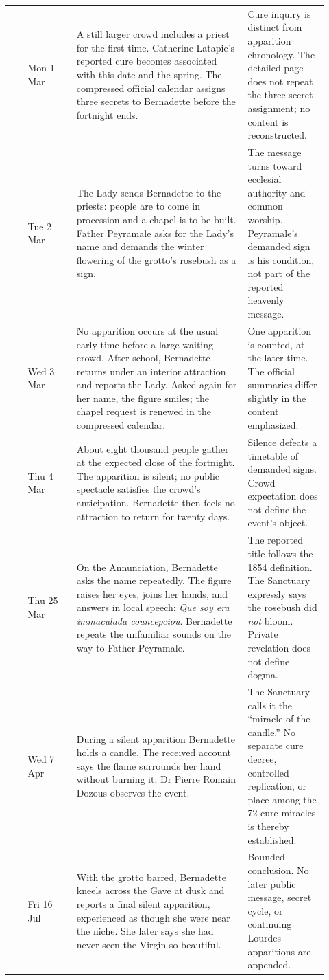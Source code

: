 \begin{longtable}{>{\bfseries\raggedright\arraybackslash}p{0.055\linewidth}>{\raggedright\arraybackslash}p{0.14\linewidth}>{\raggedright\arraybackslash}p{0.49\linewidth}>{\raggedright\arraybackslash}p{0.23\linewidth}}
12 & Mon 1 Mar & A still larger crowd includes a priest for the first time. Catherine Latapie's reported cure becomes associated with this date and the spring. The compressed official calendar assigns three secrets to Bernadette before the fortnight ends. & Cure inquiry is distinct from apparition chronology. The detailed page does not repeat the three-secret assignment; no content is reconstructed.\\
13 & Tue 2 Mar & The Lady sends Bernadette to the priests: people are to come in procession and a chapel is to be built. Father Peyramale asks for the Lady's name and demands the winter flowering of the grotto's rosebush as a sign. & The message turns toward ecclesial authority and common worship. Peyramale's demanded sign is his condition, not part of the reported heavenly message.\\
14 & Wed 3 Mar & No apparition occurs at the usual early time before a large waiting crowd. After school, Bernadette returns under an interior attraction and reports the Lady. Asked again for her name, the figure smiles; the chapel request is renewed in the compressed calendar. & One apparition is counted, at the later time. The official summaries differ slightly in the content emphasized.\\
15 & Thu 4 Mar & About eight thousand people gather at the expected close of the fortnight. The apparition is silent; no public spectacle satisfies the crowd's anticipation. Bernadette then feels no attraction to return for twenty days. & Silence defeats a timetable of demanded signs. Crowd expectation does not define the event's object.\\
16 & Thu 25 Mar & On the Annunciation, Bernadette asks the name repeatedly. The figure raises her eyes, joins her hands, and answers in local speech: \emph{Que soy era immaculada councepciou}. Bernadette repeats the unfamiliar sounds on the way to Father Peyramale. & The reported title follows the 1854 definition. The Sanctuary expressly says the rosebush did \emph{not} bloom. Private revelation does not define dogma.\\
17 & Wed 7 Apr & During a silent apparition Bernadette holds a candle. The received account says the flame surrounds her hand without burning it; Dr Pierre Romain Dozous observes the event. & The Sanctuary calls it the “miracle of the candle.” No separate cure decree, controlled replication, or place among the 72 cure miracles is thereby established.\\
18 & Fri 16 Jul & With the grotto barred, Bernadette kneels across the Gave at dusk and reports a final silent apparition, experienced as though she were near the niche. She later says she had never seen the Virgin so beautiful. & Bounded conclusion. No later public message, secret cycle, or continuing Lourdes apparitions are appended.\\
\bottomrule
\end{longtable}
\endgroup

